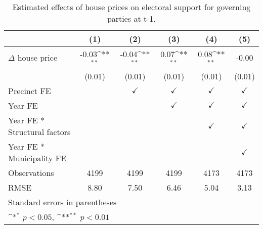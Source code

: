 \begin{table}[htbp]\centering
\def\sym#1{\ifmmode^{#1}\else\(^{#1}\)\fi}
\caption{Estimated effects of house prices on electoral support for governing parties at t-1.} \label{tab3}
\begin{tabular}{l*{5}{c}}
\hline\hline
                    &\multicolumn{1}{c}{(1)}        &\multicolumn{1}{c}{(2)}        &\multicolumn{1}{c}{(3)}        &\multicolumn{1}{c}{(4)}        &\multicolumn{1}{c}{(5)}        \\
\hline
$\Delta$ house price&       -0.03\sym{**}&       -0.04\sym{**}&        0.07\sym{**}&        0.08\sym{**}&       -0.00        \\
                    &      (0.01)        &      (0.01)        &      (0.01)        &      (0.01)        &      (0.01)        \\
[1em]
\hline Precinct FE  &                    &$\checkmark$        &$\checkmark$        &$\checkmark$        &$\checkmark$        \\
[1em]
Year FE             &                    &                    &$\checkmark$        &$\checkmark$        &$\checkmark$        \\
[1em]
Year FE * Structural factors&                    &                    &                    &$\checkmark$        &$\checkmark$        \\
[1em]
Year FE * Municipality FE&                    &                    &                    &                    &$\checkmark$        \\
\hline
Observations        &        4199        &        4199        &        4199        &        4173        &        4173        \\
RMSE                &        8.80        &        7.50        &        6.46        &        5.04        &        3.13        \\
\hline\hline
\multicolumn{6}{l}{\footnotesize Standard errors in parentheses}\\
\multicolumn{6}{l}{\footnotesize \sym{*} \(p<0.05\), \sym{**} \(p<0.01\)}\\
\end{tabular}
\end{table}
